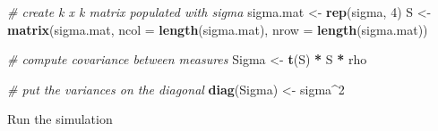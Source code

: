 \documentclass[]{book}
\newenvironment{Shaded}{\begin{snugshade}}{\end{snugshade}}
\newcommand{\CommentTok}[1]{\textcolor[rgb]{0.56,0.35,0.01}{\textit{#1}}}
\newcommand{\DataTypeTok}[1]{\textcolor[rgb]{0.13,0.29,0.53}{#1}}
\newcommand{\DecValTok}[1]{\textcolor[rgb]{0.00,0.00,0.81}{#1}}
\newcommand{\KeywordTok}[1]{\textcolor[rgb]{0.13,0.29,0.53}{\textbf{#1}}}
\newcommand{\NormalTok}[1]{#1}
\newcommand{\OperatorTok}[1]{\textcolor[rgb]{0.81,0.36,0.00}{\textbf{#1}}}
\newcommand{\StringTok}[1]{\textcolor[rgb]{0.31,0.60,0.02}{#1}}
\begin{document}
\begin{Shaded}
\begin{Highlighting}[]
\CommentTok{# create k x k matrix populated with sigma}
\NormalTok{sigma.mat <-}\StringTok{ }\KeywordTok{rep}\NormalTok{(sigma, }\DecValTok{4}\NormalTok{)}
\NormalTok{S <-}
\StringTok{  }\KeywordTok{matrix}\NormalTok{(sigma.mat,}
  \DataTypeTok{ncol =} \KeywordTok{length}\NormalTok{(sigma.mat),}
  \DataTypeTok{nrow =} \KeywordTok{length}\NormalTok{(sigma.mat))}
 
\CommentTok{# compute covariance between measures}
\NormalTok{Sigma <-}\StringTok{ }\KeywordTok{t}\NormalTok{(S) }\OperatorTok{*}\StringTok{ }\NormalTok{S }\OperatorTok{*}\StringTok{ }\NormalTok{rho  }
 
\CommentTok{# put the variances on the diagonal }
\KeywordTok{diag}\NormalTok{(Sigma) <-}\StringTok{ }\NormalTok{sigma}\OperatorTok{^}\DecValTok{2}  
\end{Highlighting}
\end{Shaded}

Run the simulation
\end{document}
